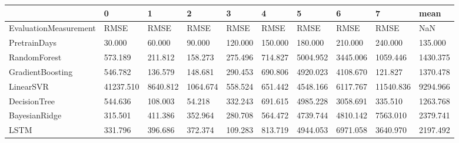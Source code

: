 \begin{tabular}{llllllllll}
\toprule
{} &         0 &        1 &        2 &       3 &       4 &        5 &        6 &         7 &     mean \\
\midrule
EvaluationMeasurement &      RMSE &     RMSE &     RMSE &    RMSE &    RMSE &     RMSE &     RMSE &      RMSE &      NaN \\
PretrainDays          &    30.000 &   60.000 &   90.000 & 120.000 & 150.000 &  180.000 &  210.000 &   240.000 &  135.000 \\
RandomForest          &   573.189 &  211.812 &  158.273 & 275.496 & 714.827 & 5004.952 & 3445.006 &  1059.446 & 1430.375 \\
GradientBoosting      &   546.782 &  136.579 &  148.681 & 290.453 & 690.806 & 4920.023 & 4108.670 &   121.827 & 1370.478 \\
LinearSVR             & 41237.510 & 8640.812 & 1064.674 & 558.524 & 651.442 & 4548.166 & 6117.767 & 11540.836 & 9294.966 \\
DecisionTree          &   544.636 &  108.003 &   54.218 & 332.243 & 691.615 & 4985.228 & 3058.691 &   335.510 & 1263.768 \\
BayesianRidge         &   315.501 &  411.386 &  352.964 & 280.708 & 564.472 & 4739.744 & 4810.142 &  7563.010 & 2379.741 \\
LSTM                  &   331.796 &  396.686 &  372.374 & 109.283 & 813.719 & 4944.053 & 6971.058 &  3640.970 & 2197.492 \\
\bottomrule
\end{tabular}
